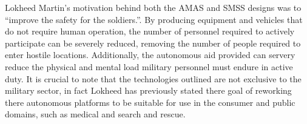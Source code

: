 Lokheed Martin's motivation behind both the AMAS and SMSS designs was to
``improve the safety for the soldiers.''.
By producing equipment and vehicles that do not require human operation, the
number of personnel required to actively participate can be severely reduced,
removing the number of people required to enter hostile locations.
Additionally, the autonomous aid provided can servery reduce the physical and
mental load military personnel must endure in active duty.
It is crucial to note that the technologies outlined are not exclusive to
the military sector, in fact Lokheed has previously stated there goal of
reworking there autonomous platforms to be suitable for use in the consumer and
public domains, such as medical and search and rescue.
